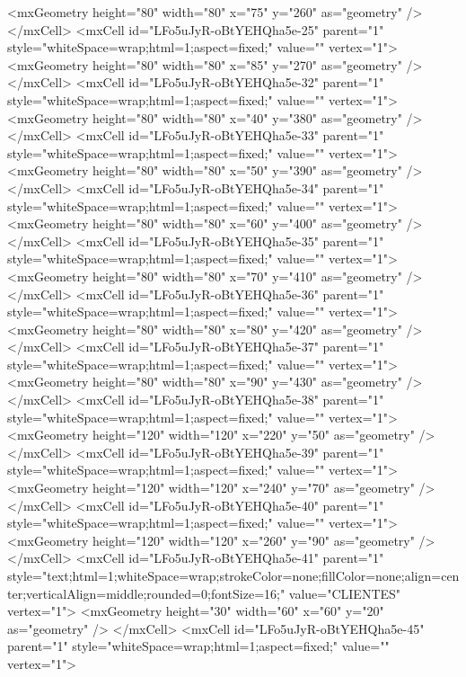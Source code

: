           <mxGeometry height="80" width="80" x="75" y="260" as="geometry" />
        </mxCell>
        <mxCell id="LFo5uJyR-oBtYEHQha5e-25" parent="1" style="whiteSpace=wrap;html=1;aspect=fixed;" value="" vertex="1">
          <mxGeometry height="80" width="80" x="85" y="270" as="geometry" />
        </mxCell>
        <mxCell id="LFo5uJyR-oBtYEHQha5e-32" parent="1" style="whiteSpace=wrap;html=1;aspect=fixed;" value="" vertex="1">
          <mxGeometry height="80" width="80" x="40" y="380" as="geometry" />
        </mxCell>
        <mxCell id="LFo5uJyR-oBtYEHQha5e-33" parent="1" style="whiteSpace=wrap;html=1;aspect=fixed;" value="" vertex="1">
          <mxGeometry height="80" width="80" x="50" y="390" as="geometry" />
        </mxCell>
        <mxCell id="LFo5uJyR-oBtYEHQha5e-34" parent="1" style="whiteSpace=wrap;html=1;aspect=fixed;" value="" vertex="1">
          <mxGeometry height="80" width="80" x="60" y="400" as="geometry" />
        </mxCell>
        <mxCell id="LFo5uJyR-oBtYEHQha5e-35" parent="1" style="whiteSpace=wrap;html=1;aspect=fixed;" value="" vertex="1">
          <mxGeometry height="80" width="80" x="70" y="410" as="geometry" />
        </mxCell>
        <mxCell id="LFo5uJyR-oBtYEHQha5e-36" parent="1" style="whiteSpace=wrap;html=1;aspect=fixed;" value="" vertex="1">
          <mxGeometry height="80" width="80" x="80" y="420" as="geometry" />
        </mxCell>
        <mxCell id="LFo5uJyR-oBtYEHQha5e-37" parent="1" style="whiteSpace=wrap;html=1;aspect=fixed;" value="" vertex="1">
          <mxGeometry height="80" width="80" x="90" y="430" as="geometry" />
        </mxCell>
        <mxCell id="LFo5uJyR-oBtYEHQha5e-38" parent="1" style="whiteSpace=wrap;html=1;aspect=fixed;" value="" vertex="1">
          <mxGeometry height="120" width="120" x="220" y="50" as="geometry" />
        </mxCell>
        <mxCell id="LFo5uJyR-oBtYEHQha5e-39" parent="1" style="whiteSpace=wrap;html=1;aspect=fixed;" value="" vertex="1">
          <mxGeometry height="120" width="120" x="240" y="70" as="geometry" />
        </mxCell>
        <mxCell id="LFo5uJyR-oBtYEHQha5e-40" parent="1" style="whiteSpace=wrap;html=1;aspect=fixed;" value="" vertex="1">
          <mxGeometry height="120" width="120" x="260" y="90" as="geometry" />
        </mxCell>
        <mxCell id="LFo5uJyR-oBtYEHQha5e-41" parent="1" style="text;html=1;whiteSpace=wrap;strokeColor=none;fillColor=none;align=center;verticalAlign=middle;rounded=0;fontSize=16;" value="CLIENTES" vertex="1">
          <mxGeometry height="30" width="60" x="60" y="20" as="geometry" />
        </mxCell>
        <mxCell id="LFo5uJyR-oBtYEHQha5e-45" parent="1" style="whiteSpace=wrap;html=1;aspect=fixed;" value="" vertex="1">
